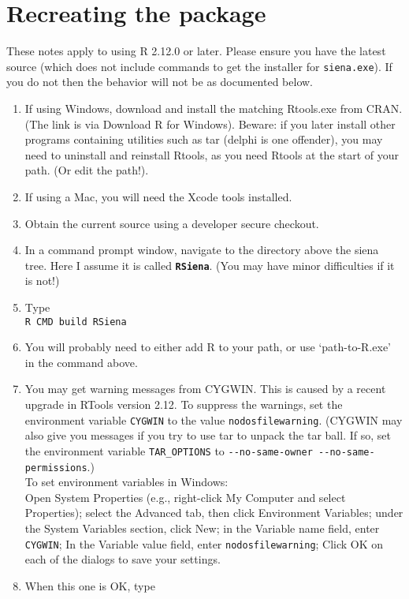 \documentclass[12pt, a4paper]{article}
\renewcommand{\=}{\,=\,}
\newcommand{\+}{\,+\,}
\newcommand{\sfn}[1]{\textbf{\texttt{#1}}}
\begin{document}
\section{Recreating the package}
These notes apply to using R 2.12.0 or later. Please ensure you have the
latest source (which does not include commands to get the installer for
\verb|siena.exe|). If you do not then the behavior will not be as documented
below.
\begin{enumerate}
\item If using Windows, download and install the matching
\textsf{Rtools.exe} from
  CRAN. (The link is via Download R for Windows). Beware: if you later install
  other programs containing utilities such as tar (delphi is one offender), you
  may need to uninstall and reinstall Rtools, as you need Rtools at the start of
  your path. (Or edit the path!).
\item If using a Mac, you will need the Xcode tools installed.
\item Obtain the current source using a developer secure checkout.
\item In a command prompt window, navigate to the directory above the siena
  tree. Here I assume it is called \sfn{RSiena}. (You may have minor
  difficulties if it is not!)
\item Type\\
\verb|R CMD build RSiena|
\item You will probably need to either add R to your path, or use
  `path-to-R.exe' in the command above.
\item You may get warning messages from CYGWIN. This is caused by a recent
  upgrade in RTools version 2.12. To suppress the warnings, set the environment
  variable \verb|CYGWIN| to the value \verb|nodosfilewarning|. (CYGWIN may also
  give you messages if you try to use tar to unpack the tar ball. If so,
  set the environment variable \verb|TAR_OPTIONS| to
\verb|--no-same-owner --no-same-permissions|.)\\
  To set environment variables in Windows:\\
  Open System Properties (e.g., right-click My Computer and select Properties);
    select the Advanced tab, then click Environment Variables;
    under the System Variables section, click New;
    in the Variable name field, enter \verb|CYGWIN|;
    In the Variable value field, enter \verb|nodosfilewarning|;
    Click OK on each of the dialogs to save your settings.
\item When this one is OK, type\\

\end{enumerate}
\end{document}

